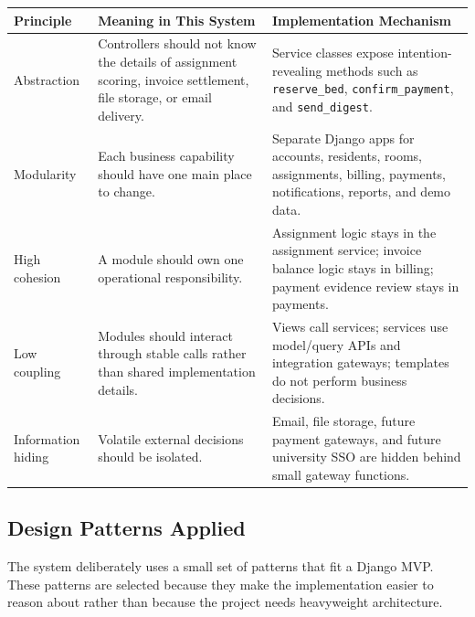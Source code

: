 \documentclass[11pt,a4paper]{article}
\begin{document}
\begin{longtable}{L{0.20\textwidth} L{0.34\textwidth} L{0.33\textwidth}}
\toprule
\textbf{Principle} & \textbf{Meaning in This System} & \textbf{Implementation Mechanism}\\
\midrule
\endhead
Abstraction & Controllers should not know the details of assignment scoring, invoice settlement, file storage, or email delivery. & Service classes expose intention-revealing methods such as \texttt{reserve\_bed}, \texttt{confirm\_payment}, and \texttt{send\_digest}.\\
Modularity & Each business capability should have one main place to change. & Separate Django apps for accounts, residents, rooms, assignments, billing, payments, notifications, reports, and demo data.\\
High cohesion & A module should own one operational responsibility. & Assignment logic stays in the assignment service; invoice balance logic stays in billing; payment evidence review stays in payments.\\
Low coupling & Modules should interact through stable calls rather than shared implementation details. & Views call services; services use model/query APIs and integration gateways; templates do not perform business decisions.\\
Information hiding & Volatile external decisions should be isolated. & Email, file storage, future payment gateways, and future university SSO are hidden behind small gateway functions.\\
\bottomrule
\end{longtable}

\subsection{Design Patterns Applied}
The system deliberately uses a small set of patterns that fit a Django MVP. These patterns are selected because they make the implementation easier to reason about rather than because the project needs heavyweight architecture.
\end{document}
